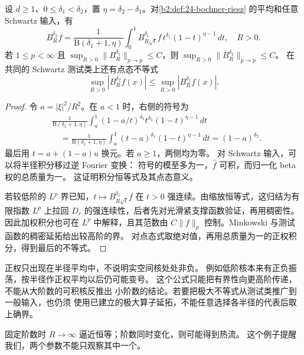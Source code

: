 \begin{proposition}[阶数的单调传递]\label{b2:prop:24-order-monotonicity}
设 \(d\geq1\)、\(0\leq\delta_1<\delta_2\)，置
\(\eta=\delta_2-\delta_1\)。对\cref{b2:def:24-bochner-riesz}
的平均和任意 Schwartz 输入，有
\[
 B_R^{\delta_2}f=
 \frac1{\mathrm B(\delta_1+1,\eta)}
 \int_0^1 B_{R\sqrt t}^{\delta_1}f\,
          t^{\delta_1}(1-t)^{\eta-1}\,dt,\quad R>0.
\]
若 \(1\leq p<\infty\) 且
\(\sup_{R>0}\|B_R^{\delta_1}\|_{p\to p}\leq C\)，则
\(\sup_{R>0}\|B_R^{\delta_2}\|_{p\to p}\leq C\)。
在共同的 Schwartz 测试类上还有点态不等式
\[
 \sup_{R>0}|B_R^{\delta_2}f(x)|
       \leq\sup_{R>0}|B_R^{\delta_1}f(x)|.
\]
\end{proposition}
\begin{proof}
令 \(a=|\xi|^2/R^2\)。在 \(a<1\) 时，右侧的符号为
\[
 \begin{aligned}
 &\frac1{\mathrm B(\delta_1+1,\eta)}
     \int_a^1(1-a/t)^{\delta_1}t^{\delta_1}
                         (1-t)^{\eta-1}\,dt\\
 &\quad=\frac1{\mathrm B(\delta_1+1,\eta)}
     \int_a^1(t-a)^{\delta_1}(1-t)^{\eta-1}\,dt
       =(1-a)^{\delta_2}.
 \end{aligned}
\]
最后用 \(t=a+(1-a)u\) 换元。若 \(a\geq1\)，两侧均为零。
对 Schwartz 输入，可以将半径积分移过逆 Fourier 变换：
符号的模至多为一，\(\widehat f\) 可积，而归一化 beta 权的总质量为一。
这证明积分恒等式及其点态意义。

若较低阶的 \(L^p\) 界已知，\(t\mapsto B_{R\sqrt t}^{\delta_1}f\)
在 \(t>0\) 强连续。由缩放恒等式，这归结为有限指数 \(L^p\)
上拉回 \(D_r\) 的强连续性，后者先对光滑紧支撑函数验证，再用稠密性。
因此加权积分也可在 \(L^p\) 中解释，且其范数由
\(C\|f\|_p\) 控制。Minkowski 与测试函数的稠密延拓给出较高阶的界。
对点态式取绝对值，再用总质量为一的正权积分，得到最后的不等式。
\end{proof}

正权只出现在半径平均中，不说明实空间核处处非负。
例如低阶核本来有正负振荡，按半径作正权平均以后仍可能变号。
这个公式只能把有界性向更高阶传递，不能从大阶数的可积核反推出
小阶数的结论。若要把极大不等式从测试类推广到一般输入，也仍须
使用已建立的极大算子延拓，不能任意选择各半径的代表后取上确界。

\ProseParagraphBreak
固定阶数时 \(R\to\infty\) 逼近恒等；阶数同时变化，则可能得到热流。
这个例子提醒我们，两个参数不能只观察其中一个。

